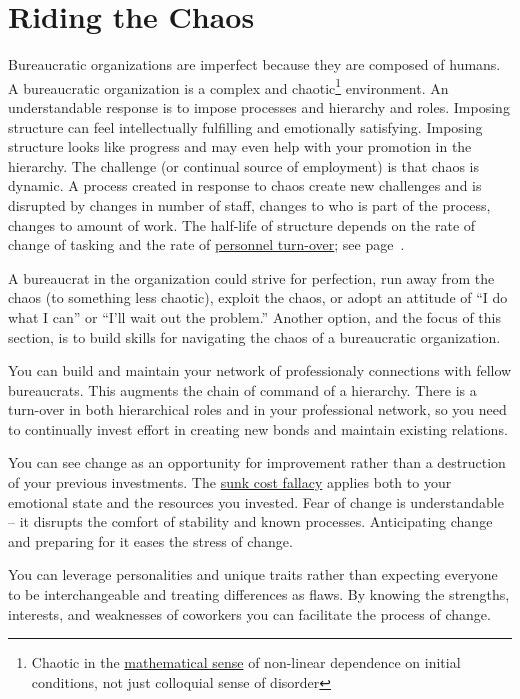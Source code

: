 \section{Riding the Chaos\label{sec:process-chaos}}

Bureaucratic organizations are imperfect because they are composed of humans. %
A bureaucratic organization is a complex and chaotic\footnote{Chaotic in the \href{https://en.wikipedia.org/wiki/Chaos_theory}{mathematical sense} 
of non-linear dependence on initial conditions, not just colloquial sense of disorder} environment. An understandable response is to impose processes and hierarchy and roles. Imposing structure can feel intellectually fulfilling and emotionally satisfying. Imposing structure looks like progress and may even help with your promotion in the hierarchy. The challenge (or continual source of employment) is that chaos is dynamic. A process created in response to chaos create new challenges and is disrupted by changes in number of staff, changes to who is part of the process, changes to amount of work. The half-life of structure depends on the rate of change of tasking and the rate of \hyperref[sec:turnover]{personnel turn-over}; see page~\pageref{sec:turnover}.

A bureaucrat in the organization could strive for perfection, run away from the chaos (to something less chaotic), exploit the chaos, or adopt an attitude of ``I do what I can'' or ``I'll wait out the problem.'' 
Another option, and the focus of this section, is to build skills for navigating the chaos of a bureaucratic organization.

You can build and maintain your network of professionaly connections with fellow bureaucrats. 
This augments the chain of command of a hierarchy. There is a turn-over in both hierarchical roles and in your professional network, so you need to continually invest effort in creating new bonds and maintain existing relations. 

You can see change as an opportunity for improvement rather than a destruction of your previous investments. The \href{https://en.wikipedia.org/wiki/Sunk_cost}{sunk cost fallacy}
applies both to your emotional state and the resources you invested. Fear of change is understandable -- it disrupts the comfort of stability and known processes. Anticipating change and preparing for it eases the stress of change.

You can leverage personalities and unique traits rather than expecting everyone to be interchangeable and treating differences as flaws. 
By knowing the strengths, interests, and weaknesses of coworkers you can facilitate the process of change. 